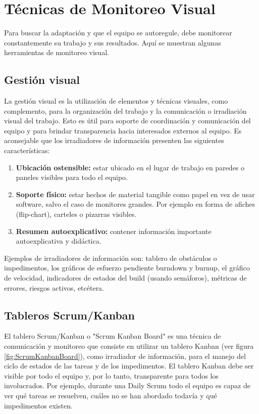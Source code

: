 \newpage
\section{Técnicas de Monitoreo Visual}

Para buscar la adaptación y que el equipo se autoregule, debe monitorear constantemente su trabajo y sus resultados. Aquí se muestran algunas herramientas de monitoreo visual.

\subsection{Gestión visual}

La gestión visual es la utilización de elementos y técnicas visuales, como complemento, para la organización del trabajo y la comunicación o irradiación visual del trabajo. Esto es útil para soporte de coordinación y comunicación del equipo y para brindar transparencia hacia interesados externos al equipo.
Es aconsejable que los irradiadores de información presenten las siguientes características:

\begin{enumerate}

\item \textbf{Ubicación ostensible:} estar ubicado en el lugar de trabajo en paredes o paneles visibles para todo el equipo.

\item \textbf{Soporte físico:} estar hechos de material tangible como papel en vez de usar software, salvo el caso de monitores grandes. Por ejemplo en forma de afiches (flip-chart), carteles o pizarras visibles.

\item \textbf{Resumen autoexplicativo:} contener información importante autoexplicativa y didáctica.

\end{enumerate}

Ejemplos de irradiadores de información son: tablero de obstáculos o impedimentos, los gráficos de esfuerzo pendiente burndown y burnup, el gráfico de velocidad, indicadores de estados del build (usando semáforos), métricas de errores, riesgos activos, etcétera.

\subsection{Tableros Scrum/Kanban}

El tablero Scrum/Kanban o "Scrum Kanban Board" es una técnica de comunicación y monitoreo que consiste en utilizar un tablero Kanban (ver figura \ref{fig:ScrumKanbanBoard}), como irradiador de información, para el manejo del ciclo de estados de las tareas y de los impedimentos. El tablero Kanban debe ser visible por todo el equipo y, por lo tanto, transparente para todos los involucrados. Por ejemplo, durante una Daily Scrum todo el equipo es capaz de ver qué tareas se resuelven, cuáles no se han abordado todavía y qué impedimentos existen.

